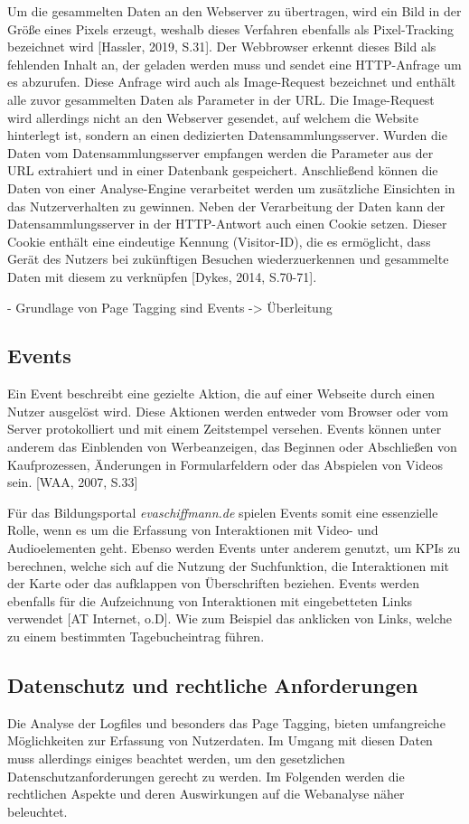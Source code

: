 Um die gesammelten Daten an den Webserver zu übertragen, wird ein Bild in der Größe eines Pixels erzeugt, weshalb dieses Verfahren ebenfalls als Pixel-Tracking bezeichnet wird [Hassler, 2019, S.31]. Der Webbrowser erkennt dieses Bild als fehlenden Inhalt an, der geladen werden muss und sendet eine HTTP-Anfrage um es abzurufen. Diese Anfrage wird auch als Image-Request bezeichnet und enthält alle zuvor gesammelten Daten als Parameter in der URL. Die Image-Request wird allerdings nicht an den Webserver gesendet, auf welchem die Website hinterlegt ist, sondern an einen dedizierten Datensammlungsserver. Wurden die Daten vom Datensammlungsserver empfangen werden die Parameter aus der URL extrahiert und in einer Datenbank gespeichert. Anschließend können die Daten von einer Analyse-Engine verarbeitet werden um zusätzliche Einsichten in das Nutzerverhalten zu gewinnen. Neben der Verarbeitung der Daten kann der Datensammlungsserver in der HTTP-Antwort auch einen Cookie setzen. Dieser Cookie enthält eine eindeutige Kennung (Visitor-ID), die es ermöglicht, dass Gerät des Nutzers bei zukünftigen Besuchen wiederzuerkennen und gesammelte Daten mit diesem zu verknüpfen [Dykes, 2014, S.70-71].

- Grundlage von Page Tagging sind Events -> Überleitung

\subsection{Events}
Ein Event beschreibt eine gezielte Aktion, die auf einer Webseite durch einen Nutzer ausgelöst wird. Diese Aktionen werden entweder vom Browser oder vom Server protokolliert und mit einem Zeitstempel versehen. Events können unter anderem das Einblenden von Werbeanzeigen, das Beginnen oder Abschließen von Kaufprozessen, Änderungen in Formularfeldern oder das Abspielen von Videos sein. [WAA, 2007, S.33]

Für das Bildungsportal \textit{evaschiffmann.de} spielen Events somit eine essenzielle Rolle, wenn es um die Erfassung von Interaktionen mit Video- und Audioelementen geht. Ebenso werden Events unter anderem genutzt, um KPIs zu berechnen, welche sich auf die Nutzung der Suchfunktion, die Interaktionen mit der Karte oder das aufklappen von Überschriften beziehen. Events werden ebenfalls für die Aufzeichnung von Interaktionen mit eingebetteten Links verwendet [AT Internet, o.D]. Wie zum Beispiel das anklicken von Links, welche zu einem bestimmten Tagebucheintrag führen.

\subsection{Datenschutz und rechtliche Anforderungen}
\label{sec:datenschutz}
Die Analyse der Logfiles und besonders das Page Tagging, bieten umfangreiche Möglichkeiten zur Erfassung von Nutzerdaten. Im Umgang mit diesen Daten muss allerdings einiges beachtet werden, um den gesetzlichen Datenschutzanforderungen gerecht zu werden. Im Folgenden werden die rechtlichen Aspekte und deren Auswirkungen auf die Webanalyse näher beleuchtet.

